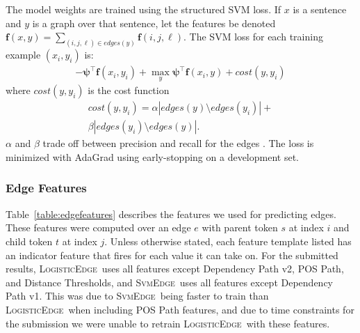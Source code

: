\documentclass[11pt]{article}
\newcommand{\sam}[1]{\textcolor{blue}{[#1 -SMT]}}
\renewcommand{\sam}[1]{}
\newcommand{\logitedge}{\textsc{LogisticEdge}}
\newcommand{\svmedge}{\textsc{SvmEdge}}
\begin{document}
The model weights are trained using the structured SVM loss.  If $x$
is a sentence and $y$ is a graph over that sentence, let the features 
be denoted $\bm{f}(x,y) = \sum_{(i,j,\ell) \in edges(y)}
\bm{f}(i,j,\ell)$.  The SVM loss for each training example $(x_i, y_i)$ is:
\begin{multline*}
-\bm\psi^\top \bm{f}(x_i,y_i) + \max_{y} \bm\psi^\top \bm{f}(x_i,y) +
\mathit{cost}(y,y_i)
\end{multline*}
where $\mathit{cost}(y,y_i)$
is the cost function
\begin{multline*}
\mathit{cost}(y,y_i) = \alpha |edges(y)\setminus edges(y_i)| + \\
\beta |edges(y_i)\setminus edges(y)|.
\end{multline*}
$\alpha$ and $\beta$ trade off between precision and recall for the
edges \cite{gimpel_softmax-margin_2010}.
The loss is minimized with AdaGrad
using early-stopping on a development set. %


\subsubsection{Edge Features}
\label{s:edgefeatures}

\label{s:features}

\sam{would be nice to cite where we stole these features from, where applicable}
Table~\ref{table:edgefeatures} describes the features we used for predicting
edges.
These features were computed over an edge $e$ with parent token $s$ at
index $i$ and child token $t$ at index $j$. 
Unless otherwise stated, each feature template listed has an indicator
feature that fires for each value it can take on.  For the submitted results,
\logitedge~uses all features except Dependency Path v2, POS Path, and Distance
Thresholds, and \svmedge~uses all features except Dependency
Path v1.  This was due to \svmedge~being faster to
train than \logitedge~when including POS Path features, and due to time constraints for the submission we were unable to retrain
\logitedge~with these features.
\end{document}
